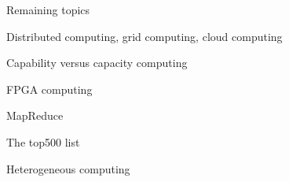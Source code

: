  {Remaining topics}

 {Distributed computing, grid computing, cloud computing}
\label{sec:cloud}


 {Capability versus capacity computing}
\label{sec:capacity}


\begin{notready}
 {FPGA computing}

\end{notready}

 {MapReduce}
\label{sec:mapreduce}


 {The top500 list}
\label{sec:top500}


 {Heterogeneous computing}
\label{sec:heterogeneous}

